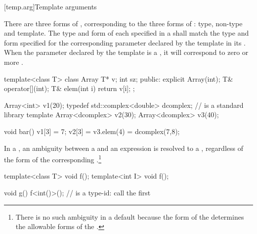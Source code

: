 [temp.arg]{Template arguments}

\pnum
{}%
There are three forms of
,
corresponding to the three forms of
:
type, non-type and template.
The type and form of each
specified in a
shall match the type and form specified for the corresponding
parameter declared by the template in its
.
When the parameter declared by the template is a
, it will correspond to zero or more
.
\begin{example}
\begin{codeblock}
template<class T> class Array {
  T* v;
  int sz;
public:
  explicit Array(int);
  T& operator[](int);
  T& elem(int i) { return v[i]; }
};

Array<int> v1(20);
typedef std::complex<double> dcomplex;  //  is a standard library template
Array<dcomplex> v2(30);
Array<dcomplex> v3(40);

void bar() {
  v1[3] = 7;
  v2[3] = v3.elem(4) = dcomplex(7,8);
}
\end{codeblock}
\end{example}

\pnum
In a
,
an ambiguity between a
and an expression is resolved to a
,
regardless of the form of the corresponding
.\footnote{There is no such ambiguity in a default
because the form of the
determines the allowable forms of the
.}
\begin{example}
\begin{codeblock}
template<class T> void f();
template<int I> void f();

void g() {
  f<int()>();       //  is a type-id: call the first 
}
\end{codeblock}
\end{example}

